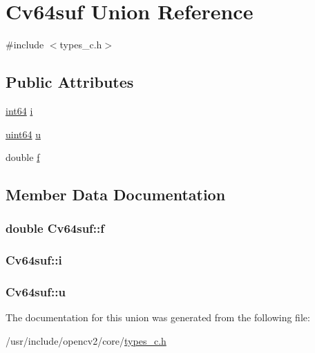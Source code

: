 \hypertarget{unionCv64suf}{\section{Cv64suf Union Reference}
\label{unionCv64suf}
}


{\ttfamily \#include $<$types\-\_\-c.\-h$>$}

\subsection*{Public Attributes}
\begin{DoxyCompactItemize}
\item 
\hyperlink{core_2types__c_8h_a7cde0074dfd288f2d70c0e035dacb28a}{int64} \hyperlink{unionCv64suf_af9bfb67aa19f4eaf8eab3b0ee48784ac}{i}
\item 
\hyperlink{core_2types__c_8h_abc0f5bc07737e498f287334775dff2b6}{uint64} \hyperlink{unionCv64suf_aeaca4eabd014c9d16ac355d23b47f42e}{u}
\item 
double \hyperlink{unionCv64suf_a963f2cd7c89ac7177d0c72d41afcf6f9}{f}
\end{DoxyCompactItemize}


\subsection{Member Data Documentation}
\hypertarget{unionCv64suf_a963f2cd7c89ac7177d0c72d41afcf6f9}{
\subsubsection[{f}]{\setlength{\rightskip}{0pt plus 5cm}double Cv64suf\-::f}}\label{unionCv64suf_a963f2cd7c89ac7177d0c72d41afcf6f9}
\hypertarget{unionCv64suf_af9bfb67aa19f4eaf8eab3b0ee48784ac}{
\subsubsection[{i}]{ Cv64suf\-::i}}\label{unionCv64suf_af9bfb67aa19f4eaf8eab3b0ee48784ac}
\hypertarget{unionCv64suf_aeaca4eabd014c9d16ac355d23b47f42e}{
\subsubsection[{u}]{ Cv64suf\-::u}}\label{unionCv64suf_aeaca4eabd014c9d16ac355d23b47f42e}


The documentation for this union was generated from the following file\-:\begin{DoxyCompactItemize}
\item 
/usr/include/opencv2/core/\hyperlink{core_2types__c_8h}{types\-\_\-c.\-h}\end{DoxyCompactItemize}
